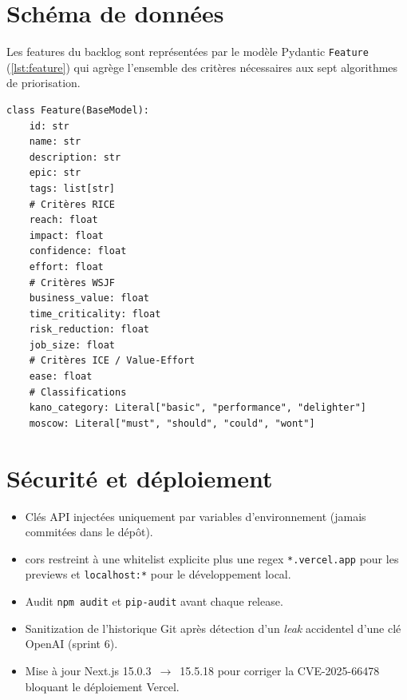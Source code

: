 \section{Schéma de données}
Les features du backlog sont représentées par le modèle Pydantic
\texttt{Feature} (\cref{lst:feature}) qui agrège l'ensemble des
critères nécessaires aux sept algorithmes de priorisation.

\begin{lstlisting}[caption={Modèle Pydantic Feature (extrait).},label={lst:feature}]
class Feature(BaseModel):
    id: str
    name: str
    description: str
    epic: str
    tags: list[str]
    # Critères RICE
    reach: float
    impact: float
    confidence: float
    effort: float
    # Critères WSJF
    business_value: float
    time_criticality: float
    risk_reduction: float
    job_size: float
    # Critères ICE / Value-Effort
    ease: float
    # Classifications
    kano_category: Literal["basic", "performance", "delighter"]
    moscow: Literal["must", "should", "could", "wont"]
\end{lstlisting}

\section{Sécurité et déploiement}
\begin{itemize}
  \item Clés API injectées uniquement par variables d'environnement
        (jamais commitées dans le dépôt).
  \item \gls{cors} restreint à une whitelist explicite plus une regex
        \texttt{*.vercel.app} pour les previews et
        \texttt{localhost:*} pour le développement local.
  \item Audit \texttt{npm audit} et \texttt{pip-audit} avant chaque
        release.
  \item Sanitization de l'historique Git après détection d'un
        \emph{leak} accidentel d'une clé OpenAI (sprint 6).
  \item Mise à jour Next.js 15.0.3~$\rightarrow$~15.5.18 pour
        corriger la CVE-2025-66478 bloquant le déploiement Vercel.
\end{itemize}
